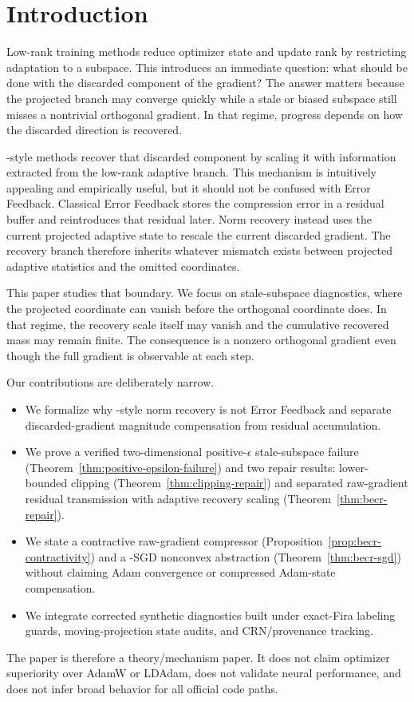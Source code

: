 \section{Introduction}

Low-rank training methods reduce optimizer state and update rank by restricting
adaptation to a subspace. This introduces an immediate question: what should be
done with the discarded component of the gradient? The answer matters because
the projected branch may converge quickly while a stale or biased subspace still
misses a nontrivial orthogonal gradient. In that regime, progress depends on
how the discarded direction is recovered.

\Fira-style methods recover that discarded component by scaling it with
information extracted from the low-rank adaptive branch. This mechanism is
intuitively appealing and empirically useful, but it should not be confused
with Error Feedback. Classical Error Feedback stores the compression error in a
residual buffer and reintroduces that residual later. Norm recovery instead
uses the current projected adaptive state to rescale the current discarded
gradient. The recovery branch therefore inherits whatever mismatch exists
between projected adaptive statistics and the omitted coordinates.

This paper studies that boundary. We focus on stale-subspace diagnostics, where
the projected coordinate can vanish before the orthogonal coordinate does. In
that regime, the recovery scale itself may vanish and the cumulative recovered
mass may remain finite. The consequence is a nonzero orthogonal gradient even
though the full gradient is observable at each step.

Our contributions are deliberately narrow.
\begin{itemize}
\item We formalize why \Fira-style norm recovery is not Error Feedback and
separate discarded-gradient magnitude compensation from residual accumulation.
\item We prove a verified two-dimensional positive-$\epsilon$ stale-subspace
failure (Theorem~\ref{thm:positive-epsilon-failure}) and two repair results:
lower-bounded clipping (Theorem~\ref{thm:clipping-repair}) and separated
raw-gradient residual transmission with adaptive recovery scaling
(Theorem~\ref{thm:becr-repair}).
\item We state a contractive raw-gradient compressor
(Proposition~\ref{prop:becr-contractivity}) and a \BECR-SGD nonconvex
abstraction (Theorem~\ref{thm:becr-sgd}) without claiming Adam convergence or
compressed Adam-state compensation.
\item We integrate corrected synthetic diagnostics built under exact-Fira
labeling guards, moving-projection state audits, and CRN/provenance tracking.
\end{itemize}

The paper is therefore a theory/mechanism paper. It does not claim optimizer
superiority over AdamW or LDAdam, does not validate neural performance, and
does not infer broad behavior for all official \Fira code paths.
